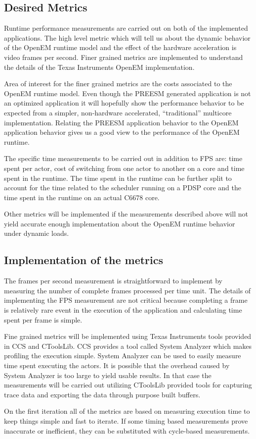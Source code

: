 \subsection{Desired Metrics}
Runtime performance measurements are carried out on both of the implemented applications. The high level metric which will tell us about the dynamic behavior of the OpenEM runtime model and the effect of the hardware acceleration is video frames per second. Finer grained metrics are implemented to understand the details of the Texas Instruments OpenEM implementation.

Area of interest for the finer grained metrics are the costs associated to the OpenEM runtime model. Even though the PREESM generated application is not an optimized application it will hopefully show the performance behavior to be expected from a simpler, non-hardware accelerated, ``traditional'' multicore implementation. Relating the PREESM application behavior to the OpenEM application behavior gives us a good view to the performance of the OpenEM runtime.

The specific time measurements to be carried out in addition to FPS are: time spent per actor, cost of switching from one actor to another on a core and time spent in the runtime. The time spent in the runtime can be further split to account for the time related to the scheduler running on a PDSP core and the time spent in the runtime on an actual C6678 core.

Other metrics will be implemented if the measurements described above will not yield accurate enough implementation about the OpenEM runtime behavior under dynamic loads.
\subsection{Implementation of the metrics}
The frames per second measurement is straightforward to implement by measuring the number of complete frames processed per time unit. The details of implementing the FPS measurement are not critical because completing a frame is relatively rare event in the execution of the application and calculating time spent per frame is simple.

Fine grained metrics will be implemented using Texas Instruments tools provided in CCS and CToolsLib. CCS provides a tool called System Analyzer which makes profiling the execution simple. System Analyzer can be used to easily measure time spent executing the actors. It is possible that the overhead caused by System Analyzer is too large to yield usable results. In that case the measurements will be carried out utilizing CToolsLib provided tools for capturing trace data and exporting the data through purpose built buffers.

On the first iteration all of the metrics are based on measuring execution time to keep things simple and fast to iterate. If some timing based measurements prove inaccurate or inefficient, they can be substituted with cycle-based measurements.